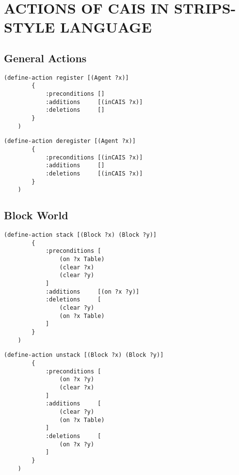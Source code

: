 
\appendix    %

\chapter{ACTIONS OF CAIS IN STRIPS-STYLE LANGUAGE}\label{apdx:strips}

\section{General Actions}

\begin{lstlisting}[caption=register]
    (define-action register [(Agent ?x)]
        {
            :preconditions []
            :additions     [(inCAIS ?x)]
            :deletions     []
        }
    )
\end{lstlisting}

\begin{lstlisting}[caption=deregister]
    (define-action deregister [(Agent ?x)]
        {
            :preconditions [(inCAIS ?x)]
            :additions     []
            :deletions     [(inCAIS ?x)]
        }
    )
\end{lstlisting}

\section{Block World}

\begin{lstlisting}[caption=stack]
    (define-action stack [(Block ?x) (Block ?y)]
        {
            :preconditions [
                (on ?x Table)
                (clear ?x)
                (clear ?y)
            ]
            :additions     [(on ?x ?y)]
            :deletions     [
                (clear ?y)
                (on ?x Table)
            ]
        }
    )
\end{lstlisting}

\begin{lstlisting}[caption=unstack]
    (define-action unstack [(Block ?x) (Block ?y)]
        {
            :preconditions [
                (on ?x ?y)
                (clear ?x)
            ]
            :additions     [
                (clear ?y)
                (on ?x Table)
            ]
            :deletions     [
                (on ?x ?y)
            ]
        }
    )
\end{lstlisting}

